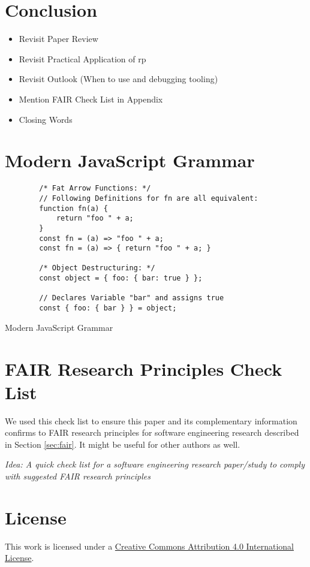 \documentclass[12pt,a4paper]{article}
\begin{document}
\section{Conclusion}
\begin{itemize}
	\item Revisit Paper Review
	\item Revisit Practical Application of rp
	\item Revisit Outlook (When to use and debugging tooling)
	\item Mention FAIR Check List in Appendix
	\item Closing Words
\end{itemize}

\appendix
\section{Modern JavaScript Grammar}
\label{sec:modern-javascript-grammar}

\begin{listing}
	\begin{verbatim}
		/* Fat Arrow Functions: */
		// Following Definitions for fn are all equivalent:
		function fn(a) {
			return "foo " + a;
		}
		const fn = (a) => "foo " + a;
		const fn = (a) => { return "foo " + a; }

		/* Object Destructuring: */
		const object = { foo: { bar: true } };

		// Declares Variable "bar" and assigns true
		const { foo: { bar } } = object;
	\end{verbatim}
	\caption{Modern JavaScript Grammar}
\end{listing}


\section{FAIR Research Principles Check List}

We used this check list to ensure this paper and its complementary information confirms to FAIR research principles for software engineering research described in Section \ref{sec:fair}. It might be useful for other authors as well.

\begin{framed}
	\noindent\emph{Idea: A quick check list for a software engineering research paper/study to comply with suggested FAIR research principles}
\end{framed}




\section*{License}
\ccby\thinspace\thinspace This work is licensed under a \href{https://creativecommons.org/licenses/by/4.0/}{Creative Commons Attribution 4.0 International License}.
\end{document}
